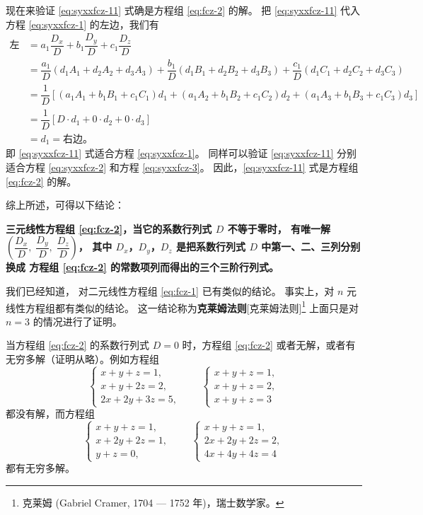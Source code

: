 现在来验证 \eqref{eq:syxxfcz-11} 式确是方程组 \eqref{eq:fcz-2} 的解。
把 \eqref{eq:syxxfcz-11} 代入方程 \eqref{eq:syxxfcz-1} 的左边，我们有
\begin{align*}
    \text{左边} &= a_1\dfrac{D_x}{D} + b_1\dfrac{D_y}{D} + c_1\dfrac{D_z}{D} \\
        &= \dfrac{a_1}{D}(d_1A_1 + d_2A_2 + d_3A_3)
            + \dfrac{b_1}{D}(d_1B_1 + d_2B_2 + d_3B_3)
            + \dfrac{c_1}{D}(d_1C_1 + d_2C_2 + d_3C_3) \\
        &= \dfrac{1}{D}[(a_1A_1 + b_1B_1 + c_1C_1)d_1
                        + (a_1A_2 + b_1B_2 + c_1C_2)d_2
                        + (a_1A_3 + b_1B_3 + c_1C_3)d_3] \\
        &= \dfrac{1}{D}[D \cdot d_1 + 0 \cdot d_2 + 0 \cdot d_3] \\
        &= d_1 = \text{右边。}
\end{align*}
即 \eqref{eq:syxxfcz-11} 式适合方程 \eqref{eq:syxxfcz-1}。
同样可以验证 \eqref{eq:syxxfcz-11} 分别适合方程 \eqref{eq:syxxfcz-2} 和方程 \eqref{eq:syxxfcz-3}。
因此，\eqref{eq:syxxfcz-11} 式是方程组 \eqref{eq:fcz-2} 的解。

综上所述，可得以下结论：

\textbf{三元线性方程组 \eqref{eq:fcz-2}，当它的系数行列式 $D$ 不等于零时，
有唯一解 $\left( \dfrac{D_x}{D},\; \dfrac{D_y}{D},\; \dfrac{D_z}{D} \right)$，
其中 $D_x$，$D_y$，$D_z$ 是把系数行列式 $D$ 中第一、二、三列分别换成
方程组 \eqref{eq:fcz-2} 的常数项列而得出的三个三阶行列式。}

我们已经知道， 对二元线性方程组 \eqref{eq:fcz-1} 已有类似的结论。
事实上，对 $n$ 元线性方程组都有类似的结论。
这一结论称为\textbf{克莱姆法则}[克莱姆法则]\footnote{克莱姆 (Gabriel Cramer, 1704 — 1752 年)，瑞士数学家。}
上面只是对 $n = 3$ 的情况进行了证明。

当方程组 \eqref{eq:fcz-2} 的系数行列式 $D = 0$ 时，方程组 \eqref{eq:fcz-2}
或者无解，或者有无穷多解（证明从略）。例如方程组
$$
\begin{cases}
    x + y + z = 1, \\
    x + y + 2z = 2, \\
    2x + 2y + 3z = 5,
\end{cases} \qquad
\begin{cases}
    x + y + z = 1, \\
    x + y + z = 2, \\
    x + y + z = 3
\end{cases}
$$
都没有解，而方程组
$$
\begin{cases}
    x + y + z = 1, \\
    x + 2y + 2z = 1, \\
    y + z = 0,
\end{cases} \qquad
\begin{cases}
    x + y + z = 1, \\
    2x + 2y + 2z = 2, \\
    4x + 4y + 4z = 4
\end{cases}
$$
都有无穷多解。

